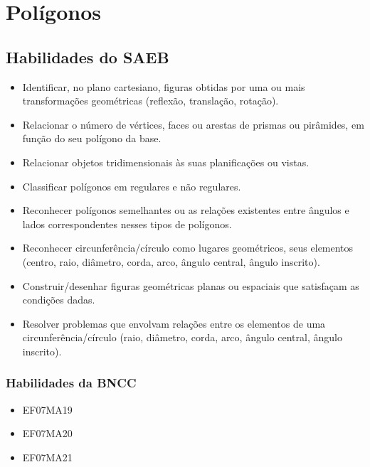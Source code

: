 \chapter{Polígonos}

\section*{Habilidades do SAEB}
\begin{itemize}
\item Identificar, no plano cartesiano, figuras obtidas
por uma ou mais transformações geométricas (reflexão, translação,
rotação).
\item
  Relacionar o número de vértices, faces ou arestas de prismas ou
  pirâmides, em função do seu polígono da base.
\item
  Relacionar objetos tridimensionais às suas planificações ou vistas.
\item
  Classificar polígonos em regulares e não regulares.
\item
  Reconhecer polígonos semelhantes ou as relações existentes entre
  ângulos e lados correspondentes nesses tipos de polígonos.
\item
  Reconhecer circunferência/círculo como lugares geométricos, seus
  elementos (centro, raio, diâmetro, corda, arco, ângulo central, ângulo
  inscrito).
\item
  Construir/desenhar figuras geométricas planas ou espaciais que
  satisfaçam as condições dadas.
\item
  Resolver problemas que envolvam relações entre os elementos de uma
  circunferência/círculo (raio, diâmetro, corda, arco, ângulo central,
  ângulo inscrito).
\end{itemize}

\subsection{Habilidades da BNCC}
\begin{itemize}
\item EF07MA19
\item EF07MA20
\item EF07MA21
\end{itemize}



